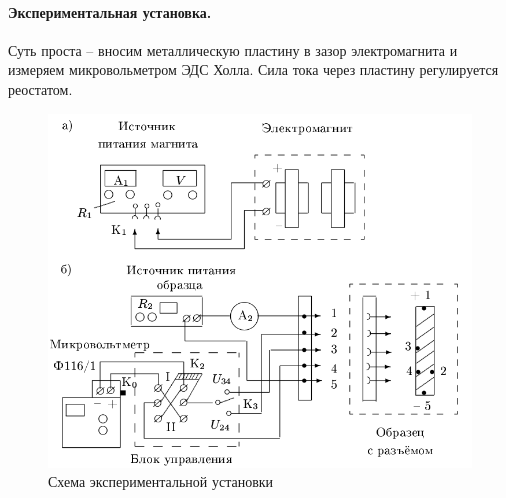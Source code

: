 \documentclass{../lab_class}
\begin{document}
\paragraph{Экспериментальная установка.}
Суть проста -- вносим металлическую пластину в зазор электромагнита и измеряем микровольметром ЭДС Холла. Сила тока через пластину регулируется реостатом.

\begin{figure}[H]
	\centering
	\includegraphics[width = 0.6 \textwidth]{scheme.png}
	\caption{Схема экспериментальной установки}
	\label{fig:schemet}
\end{figure}
\end{document}
